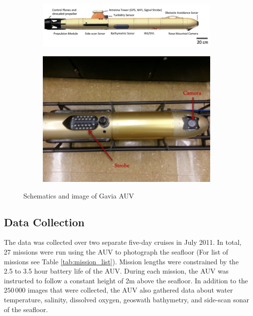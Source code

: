 \documentclass {udthesis}
\begin{document}
\begin{figure}
  \centering
  \begin{subfigure}[]{0.7\textwidth}
      \includegraphics[width=\textwidth,natwidth=1052,natheight=428]{auv_schematics}
  \end{subfigure}
  \begin{subfigure}[]{0.6\textwidth}
      \includegraphics[width=\textwidth,natwidth=690,natheight=518]{auv_image}    
  \end{subfigure}
  \caption{Schematics and image of Gavia AUV }
  \label{fig:gavia_auv}
\end{figure}

\subsection{Data Collection}

The data was collected over two separate five-day cruises in July 2011.   
In total, 27 missions were run using the AUV to photograph the seafloor (For list of missions see Table \ref{tab:mission_list}).  
Mission lengths were constrained by the 2.5 to 3.5 hour battery life of the AUV.  
During each mission, the AUV was instructed to follow a constant height of 2\;m
above the seafloor.  In addition to the $250\,000$ images that were collected, the 
AUV also gathered data about water temperature, salinity, dissolved oxygen, 
geoswath bathymetry, and side-scan sonar of the seafloor.
\end{document}
